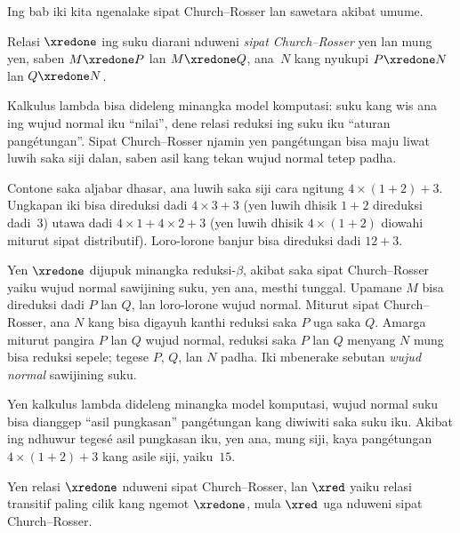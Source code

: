 \documentclass[../../../include/open-logic-section]{subfiles}
\begin{document}


Ing bab iki kita ngenalake
sipat Church--Rosser lan sawetara
akibat umume.

\begin{defn} Relasi $\xredone$ ing
  suku diarani nduweni \emph{sipat Church--Rosser}
  yen lan mung yen, saben
  $M \xredone P$ lan $M \xredone Q$,
  ana~$N$ kang nyukupi
  $P \xredone N$ lan $Q \xredone N$.
\end{defn}

Kalkulus lambda bisa dideleng minangka
model komputasi: suku kang wis ana
ing wujud normal iku ``nilai'',
dene relasi reduksi ing suku iku
``aturan pangétungan''.
Sipat Church--Rosser njamin yen
pangétungan bisa maju liwat luwih
saka siji dalan, saben asil kang
tekan wujud normal tetep padha.

Contone saka aljabar dhasar,
ana luwih saka siji cara
ngitung $4 \times (1+2) + 3$.
Ungkapan iki bisa direduksi dadi
$4 \times 3+3$ (yen luwih dhisik
$1+2$ direduksi dadi~$3$)
utawa dadi $4 \times 1+4
\times 2+3$ (yen luwih dhisik
$4 \times (1+2)$ diowahi
miturut sipat distributif).
Loro-lorone banjur bisa
direduksi dadi $12+3$.

Yen $\xredone$ dijupuk minangka
reduksi-$\beta$, akibat saka
sipat Church--Rosser yaiku
wujud normal sawijining suku,
yen ana, mesthi tunggal.
Upamane $M$ bisa direduksi
dadi $P$ lan $Q$, lan
loro-lorone wujud normal.
Miturut sipat Church--Rosser,
ana $N$ kang bisa digayuh
kanthi reduksi saka $P$
uga saka $Q$.
Amarga miturut pangira
$P$ lan $Q$ wujud normal,
reduksi saka $P$ lan $Q$
menyang $N$ mung bisa
reduksi sepele; tegese
$P$, $Q$, lan $N$ padha.
Iki mbenerake sebutan
\emph{wujud normal} sawijining suku.

Yen kalkulus lambda dideleng
minangka model komputasi,
wujud normal suku bisa dianggep
``asil pungkasan'' pangétungan
kang diwiwiti saka suku iku.
Akibat ing ndhuwur tegesé
asil pungkasan iku, yen ana,
mung siji, kaya pangétungan
$4 \times (1+2)+3$ kang
asile siji, yaiku~$15$.

\begin{thm} 
  Yen relasi $\xredone$ nduweni
  sipat Church--Rosser, lan
  $\xred$ yaiku relasi transitif
  paling cilik kang ngemot
  $\xredone$, mula $\xred$
  uga nduweni sipat Church--Rosser.
\end{thm}
\end{document}
